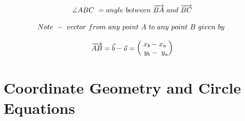\documentclass{article}
\begin{document}
\begin{multicols}{2}
\[\begin{array}{>{\displaystyle}c}
        \angle ABC\ =angle\ between\ \overrightarrow{BA} \ and\ \overrightarrow{BC}\\
        \\
        Note\ -\ vector\ from\ any\ point\ A\ to\ any\ point\ B\ given\ by\ \\
        \\
        \overrightarrow{AB} =\vec{b} - \vec{a} =\begin{pmatrix}
        x_{b} - x_{a}\\
        \ y_{b} - \ y_{a}
        \end{pmatrix}
    \end{array}
    \]
\end{multicols}



\newpage 

\section{Coordinate Geometry and Circle Equations}
\end{document}
